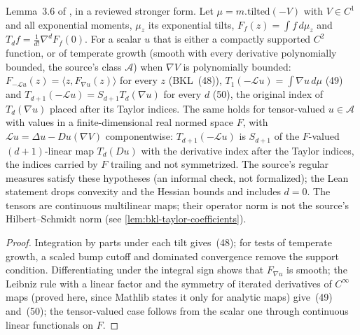 \begin{lemma}
  \label{lem:bkl-tilt-generator}
  \leanok
  Lemma~3.6 of \cite{BizeulKlartagLehec2026}, in a reviewed stronger form.  Let
  $\mu=m.\mathrm{tilted}(-V)$ with $V\in C^1$ and all exponential moments, $\mu_z$ its
  exponential tilts, $F_f(z)=\int f\,d\mu_z$ and $T_df=\frac1{d!}\nabla^dF_f(0)$.  For a scalar
  $u$ that is either a compactly supported $C^2$ function, or of temperate growth (smooth with every
  derivative polynomially bounded, the source's class $\mathcal A$) when $\nabla V$ is polynomially
  bounded: $F_{-\mathcal Lu}(z)=\langle z,F_{\nabla u}(z)\rangle$ for every $z$ (BKL~(48)),
  $T_1(-\mathcal Lu)=\int\nabla u\,d\mu$ (49) and $T_{d+1}(-\mathcal Lu)=S_{d+1}T_d(\nabla u)$ for
  every $d$ (50), the original index of $T_d(\nabla u)$ placed after its Taylor indices.  The same
  holds for tensor-valued $u\in\mathcal A$ with values in a finite-dimensional real normed space $F$,
  with $\mathcal Lu=\Delta u-Du(\nabla V)$ componentwise: $T_{d+1}(-\mathcal Lu)$ is $S_{d+1}$ of the
  $F$-valued $(d+1)$-linear map $T_d(Du)$ with the derivative index after the Taylor indices, the
  indices carried by $F$ trailing and not symmetrized.  The source's regular measures satisfy these
  hypotheses (an informal check, not formalized); the Lean statement drops convexity and the Hessian
  bounds and includes $d=0$.  The tensors are continuous multilinear maps; their operator norm is
  not the source's Hilbert--Schmidt norm (see \cref{lem:bkl-taylor-coefficients}).
\end{lemma}
\begin{proof}
  \leanok
  Integration by parts under each tilt gives~(48); for tests of temperate growth, a scaled bump
  cutoff and dominated convergence remove the support condition.  Differentiating under the integral sign shows
  that $F_{\nabla u}$ is smooth; the Leibniz rule with a linear factor and the symmetry of
  iterated derivatives of $C^\infty$ maps (proved here, since Mathlib states it only for analytic
  maps) give~(49) and~(50); the tensor-valued case follows from the scalar one through continuous
  linear functionals on $F$.
\end{proof}

